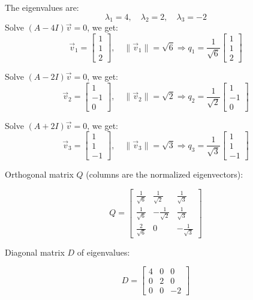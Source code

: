 \documentclass[12pt]{article}
\begin{document}
\begin{enumerate}[leftmargin=0em]
    The eigenvalues are:
    \[
    \lambda_1 = 4, \quad \lambda_2 = 2, \quad \lambda_3 = -2
    \]
    Solve \( (A - 4I)\vec{v} = 0 \), we get:
    \[
    \vec{v}_1 = \begin{bmatrix} 1 \\ 1 \\ 2 \end{bmatrix}, \quad
    \|\vec{v}_1\| = \sqrt{6}
    \Rightarrow
    q_1 = \frac{1}{\sqrt{6}} \begin{bmatrix} 1 \\ 1 \\ 2 \end{bmatrix}
    \]
    
    Solve \( (A - 2I)\vec{v} = 0 \), we get:
    \[
    \vec{v}_2 = \begin{bmatrix} 1 \\ -1 \\ 0 \end{bmatrix}, \quad
    \|\vec{v}_2\| = \sqrt{2}
    \Rightarrow
    q_2 = \frac{1}{\sqrt{2}} \begin{bmatrix} 1 \\ -1 \\ 0 \end{bmatrix}
    \]
    
    Solve \( (A + 2I)\vec{v} = 0 \), we get:
    \[
    \vec{v}_3 = \begin{bmatrix} 1 \\ 1 \\ -1 \end{bmatrix}, \quad
    \|\vec{v}_3\| = \sqrt{3}
    \Rightarrow
    q_3 = \frac{1}{\sqrt{3}} \begin{bmatrix} 1 \\ 1 \\ -1 \end{bmatrix}
    \]
    
    Orthogonal matrix \( Q \) (columns are the normalized eigenvectors):
    
    \[
    Q =
    \begin{bmatrix}
    \frac{1}{\sqrt{6}} & \frac{1}{\sqrt{2}} & \frac{1}{\sqrt{3}} \\
    \frac{1}{\sqrt{6}} & -\frac{1}{\sqrt{2}} & \frac{1}{\sqrt{3}} \\
    \frac{2}{\sqrt{6}} & 0 & -\frac{1}{\sqrt{3}}
    \end{bmatrix}
    \]
    
    Diagonal matrix \( D \) of eigenvalues:
    
    \[
    D = \begin{bmatrix}
    4 & 0 & 0 \\
    0 & 2 & 0 \\
    0 & 0 & -2
    \end{bmatrix}
    \]
    
\end{enumerate}
\end{document}
